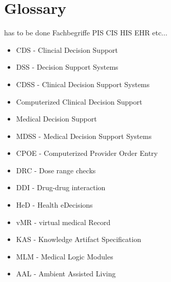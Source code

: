 \documentclass{report}
\theoremstyle{definition}
\theoremstyle{example}
\begin{document}
\chapter{Glossary}
has to be done
Fachbegriffe 
PIS
CIS
HIS
EHR
etc...

\begin{itemize}
   \item CDS - Clincial Decision Support
   \item DSS - Decision Support Systems
   \item CDSS - Clinical Decision Support Systems
   \item Computerized Clinical Decision Support
   \item Medical Decision Support
   \item MDSS - Medical Decision Support Systems
   \item CPOE - Computerized Provider Order Entry
   \item DRC - Dose range checks
   \item DDI - Drug-drug interaction
   \item HeD - Health eDecisions
   \item vMR - virtual medical Record
   \item KAS - Knowledge Artifact Specification
   \item MLM - Medical Logic Modules
   \item AAL - Ambient Assisted Living
\end{itemize}
\end{document}
